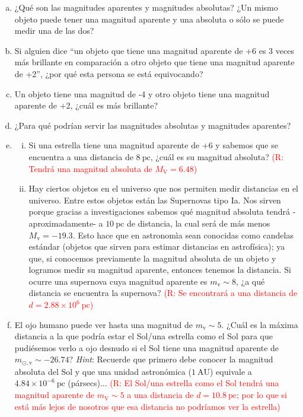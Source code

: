 \documentclass{article}
\begin{document}
\begin{enumerate} [a)]
\item ¿Qué son las magnitudes aparentes y magnitudes absolutas? ¿Un mismo objeto puede tener una magnitud aparente y una absoluta o sólo se puede medir una de las dos?

\item Si alguien dice ``un objeto que tiene una magnitud aparente de +6 es 3 veces más brillante en comparación a otro objeto que tiene una magnitud aparente de +2'', ¿por qué esta persona se está equivocando?

\item Un objeto tiene una magnitud de -4 y otro objeto tiene una magnitud aparente de +2, ¿cuál es más brillante?

\item ¿Para qué podrían servir las magnitudes absolutas y magnitudes aparentes?

\item  \begin{enumerate} [i)]
\item Si una estrella tiene una magnitud aparente de +6 y sabemos que se encuentra a una distancia de $8 \ \text{pc}$, ¿cuál es su magnitud absoluta? \textcolor{red}{(R: Tendrá una magnitud absoluta de $M_\text{V} = 6.48$)}

\item Hay ciertos objetos en el universo que nos permiten medir distancias en el universo. Entre estos objetos están las Supernovas tipo Ia. Nos sirven porque gracias a investigaciones sabemos qué magnitud absoluta tendrá -aproximadamente- a $10 \ \text{pc}$ de distancia, la cual será de más menos $M_\text{v} = -19.3$. Esto hace que en astronomìa sean conocidas como candelas estándar (objetos que sirven para estimar distancias en astrofísica); ya que, si conocemos previamente la magnitud absoluta de un objeto y logramos medir su magnitud aparente, entonces tenemos la distancia. Si ocurre una supernova cuya magnitud aparente es $m_\text{v} \sim 8$, ¿a qué distancia se encuentra la supernova? \textcolor{red}{(R: Se encontrará a una distancia de $d = 2.88 \times 10^{6}\ \text{pc}$)}
\end{enumerate}

\item El ojo humano puede ver hasta una magnitud de $m_\text{v} \sim 5$. ¿Cuál es la máxima distancia a la que podría estar el Sol/una estrella como el Sol para que pudiésemos verlo a ojo desnudo si el Sol tiene una magnitud aparente de $m_{\odot ,\text{v}} \sim -26.74$? \textit{Hint}: Recuerde que primero debe conocer la magnitud absoluta del Sol y que una unidad astronómica ($1 \ \text{AU}$) equivale a $4.84 \times 10^{-6} \ \text{pc}$ (pársecs)... \textcolor{red}{(R: El Sol/una estrella como el Sol tendrá una magnitud aparente de $m_\text{V} \sim 5$ a una distancia de $d = 10.8 \ \text{pc}$; por lo que si está más lejos de nosotros que esa distancia no podríamos ver la estrella)}


\end{enumerate}
\end{document}
